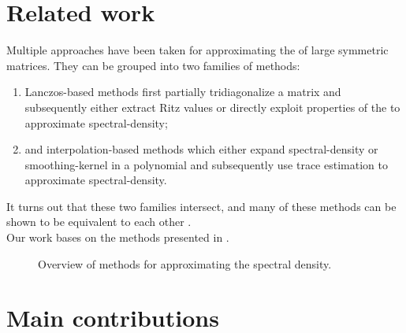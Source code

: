 
\section{Related work}
\label{sec:1-introduction-related}

Multiple approaches have been taken for approximating the 
of large symmetric matrices. They can be grouped into two families of methods:

\begin{enumerate}
    \item Lanczos-based methods
    first partially tridiagonalize a matrix and subsequently either extract Ritz values
    \cite{lin2016review, chen2021slq} or directly exploit properties of the
     \cite{haydock1972electronic, lin2016review}
    to approximate \gls{spectral-density};
    \item and interpolation-based methods which either expand
    \gls{spectral-density} \cite{weisse2006kpm} or \gls{smoothing-kernel}
    \cite{lin2016review,lin2017randomized} in a polynomial and subsequently
    use trace estimation to approximate \gls{spectral-density}.
\end{enumerate}


It turns out that these two families intersect, and many of these methods
can be shown to be equivalent to each other \cite{chen2023kpm}.\\

Our work bases on the methods presented in \cite{lin2017randomized}.



\begin{figure}[ht]
    \centering
    
    \caption{Overview of methods for approximating the spectral density.}
    \label{fig:1-introduction-literature-overview}
\end{figure}


\section{Main contributions}
\label{sec:1-introduction-contributions}

